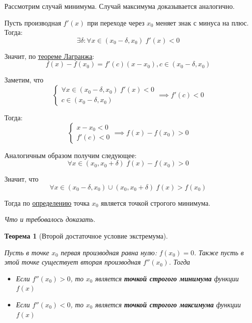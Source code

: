 \documentclass[a4paper,12pt,oneside]{extbook}
\newcommand{\newpar}{$ $\par\nobreak\ignorespaces}
\theoremstyle{numbered}
\theoremstyle{unnumbered}
\theoremstyle{named}
\newtheorem{theorem}{Теорема}[section]
\theoremstyle{unnumbered}
\theoremstyle{named}
\theoremstyle{named}
\theoremstyle{named}
\renewenvironment{proof}[1][]{\breakenv[Доказательство]{\if\relax\detokenize{#1}\relax\else\;\fi}{\textbf{#1}}}{\smallskip\newpar \hfill\textit{Что и требовалось доказать.}}
\newcommand{\plink}[2]{\hyperref[#1]{\color{blue}\underline{#2}}}
\begin{document}
\begin{proof}
    Рассмотрим случай минимума. Случай максимума доказывается аналогично.

    Пусть производная \(f'(x)\) при переходе через \(x_0\) меняет знак с минуса на плюс. Тогда:
    \[
        \exists \delta: \forall x \in (x_0 - \delta, x_0) \; f'(x) < 0
    \]

    Значит, по \plink{theorem:Теорема Лагранжа}{теореме Лагранжа}:
    \[
        f(x) - f(x_0) = f'(c)(x - x_0), c \in (x_0 - \delta, x_0)
    \]

    Заметим, что
    \[
        \begin{cases}
            \forall x \in (x_0 - \delta, x_0) \; f'(x) < 0 \\
            c \in (x_0 - \delta, x_0)
        \end{cases}
        \implies
        f'(c) < 0
    \]

    Тогда:
    \[
        \begin{cases}
            x - x_0 < 0 \\
            f'(c) < 0
        \end{cases}
        \implies
        f(x) - f(x_0) > 0
    \]

    Аналогичным образом получим следующее:
    \[
        \forall x \in (x_0, x_0 + \delta) \; f(x) - f(x_0) > 0
    \]

    Значит, что
    \[
        \forall x \in (x_0 - \delta, x_0) \cup (x_0, x_0 + \delta) \; f(x) > f(x_0)
    \]

    Тогда по \plink{def:Локальный минимум и локальный максимум}{определению} точка \(x_0\) является точкой строгого минимума.
\end{proof}

\begin{theorem}[Второй достаточное условие экстремума]
    \newpar
    Пусть в точке \(x_0\) первая производная равна нулю: \(f(x_0) = 0\). Также пусть в этой точке существует вторая производная \(f''(x_0)\). Тогда
    \begin{itemize}
        \item {Если \(f''(x_0) > 0\), то \(x_0\) является \textbf{точкой строгого минимума} функции \(f(x)\)}
        \item {Если \(f''(x_0) < 0\), то \(x_0\) является \textbf{точкой строгого максимума} функции \(f(x)\)}
    \end{itemize}
\end{theorem}
\end{document}
